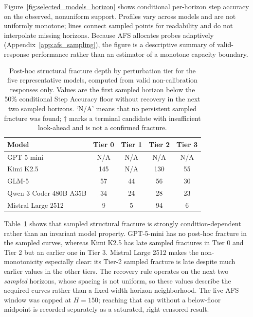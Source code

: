\documentclass{article}
\begin{document}
Figure~\ref{fig:selected_models_horizon} shows conditional per-horizon step accuracy on the observed, nonuniform support. Profiles vary across models and are not uniformly monotone; lines connect sampled points for readability and do not interpolate missing horizons. Because AFS allocates probes adaptively (Appendix~\ref{app:afs_sampling}), the figure is a descriptive summary of valid-response performance rather than an estimator of a monotone capacity boundary.

\begin{table}[!ht]
\centering
\caption{Post-hoc structural fracture depth by perturbation tier for the five representative models, computed from valid non-calibration responses only. Values are the first sampled horizon below the 50\% conditional Step Accuracy floor without recovery in the next two sampled horizons. `N/A' means that no persistent sampled fracture was found; $\dagger$ marks a terminal candidate with insufficient look-ahead and is not a confirmed fracture.}
\label{tab:fracture_selected}
\scriptsize
\begin{tabular}{lcccc}
\toprule
\textbf{Model} & \textbf{Tier 0} & \textbf{Tier 1} & \textbf{Tier 2} & \textbf{Tier 3} \\
\midrule
GPT-5-mini & N/A & N/A & N/A & N/A \\
Kimi K2.5 & 145 & N/A & 130 & 55 \\
GLM-5 & 57 & 44 & 56 & 30 \\
Qwen 3 Coder 480B A35B & 34 & 24 & 28 & 23 \\
Mistral Large 2512 & 9 & 5 & 94 & 6 \\
\bottomrule
\end{tabular}
\end{table}

Table~\ref{tab:fracture_selected} shows that sampled structural fracture is strongly condition-dependent rather than an invariant model property. GPT-5-mini has no post-hoc fracture in the sampled curves, whereas Kimi K2.5 has late sampled fractures in Tier 0 and Tier 2 but an earlier one in Tier 3. Mistral Large 2512 makes the non-monotonicity especially clear: its Tier-2 sampled fracture is late despite much earlier values in the other tiers. The recovery rule operates on the next two \emph{sampled} horizons, whose spacing is not uniform, so these values describe the acquired curves rather than a fixed-width horizon neighborhood. The live AFS window was capped at $H=150$; reaching that cap without a below-floor midpoint is recorded separately as a saturated, right-censored result.
\end{document}
